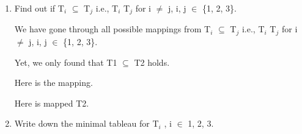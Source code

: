 \documentclass[10pt]{article}
\begin{document}
		\begin{enumerate}
			\item Find out if T$_{i}$ $\subseteq$ T$_{j}$ i.e., T$_{i}$  T$_{j}$ for i $\neq$ j, i, j $\in$ \{1, 2, 3\}.
			
			We have gone through all possible mappings from T$_{i}$ $\subseteq$ T$_{j}$ i.e., T$_{i}$  T$_{j}$ for i $\neq$ j, i, j $\in$ \{1, 2, 3\}.
			
			Yet, we only found that T1 $\subseteq$ T2 holds.
			
			
			\vspace{3em}
			\begin{minipage}[t]{.98\linewidth}
				\begin{minipage}[t]{0.55\linewidth}
					
					Here is the mapping.\\
					\bigskip
					
				\end{minipage}
				\quad
				\begin{minipage}[t]{0.4\linewidth}
					Here is mapped T2.\\
					
					\begin{table}[H]
					\end{table}
				\end{minipage}
			\end{minipage}
			
			\bigskip			
			
			\item Write down the minimal tableau for T$_{i}$ , i $\in$ {1, 2, 3}.
		\end{enumerate}
		
\end{document}
